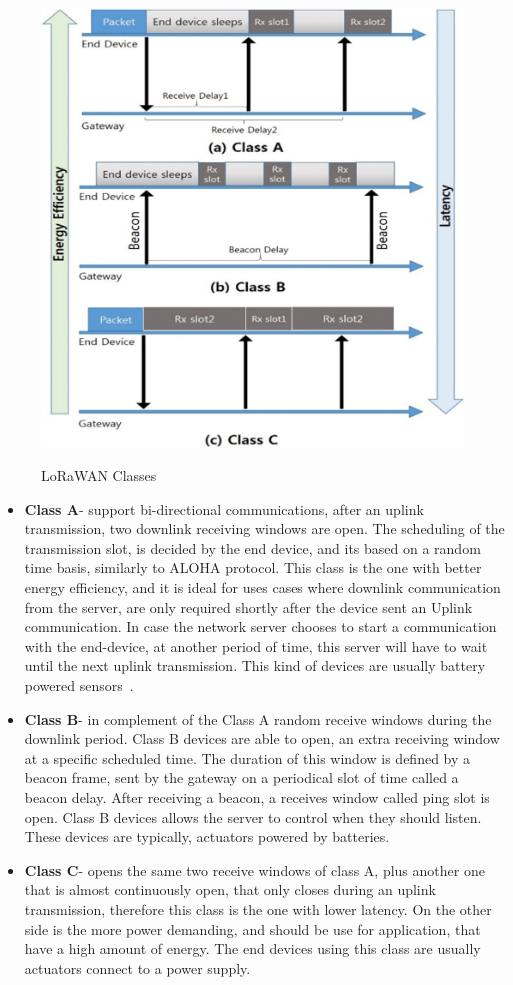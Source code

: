 \begin{figure}[htbp]
  \centering
    {\includegraphics[width=0.5\linewidth]{Chapters/Figures/loraclasses.jpg}}%
  \caption{LoRaWAN Classes~\cite{Sinha2017}}
  \label{fig:lora_classes}
\end{figure}

\begin{itemize}
	\item \textbf{Class A}- support bi-directional communications, after an uplink transmission, two downlink receiving windows are open. The scheduling of the transmission slot, is decided by the end device, and its based on a random time basis, similarly to ALOHA protocol.
	This class is the one with better energy efficiency, and it is ideal for uses cases where downlink communication from the server, are only required shortly after the device sent an Uplink communication.
	In case the network server chooses to start a communication with the end-device, at another period of time, this server will have to wait until the next uplink transmission. This kind of devices are usually battery powered sensors~\cite{Pacheco19}.

	\item\textbf{Class B}- in complement of the Class A random receive windows during the downlink period. Class B devices are able to open, an extra receiving window at a specific scheduled time. The duration of this window is defined by a beacon frame, sent by the gateway on a periodical slot of time called a beacon delay. After receiving a beacon, a receives window called ping slot is open. Class B devices allows the server to control when they should listen. These devices are typically, actuators powered by batteries.
	
	\item \textbf{Class C}- opens the same two receive windows of class A, plus another one that is almost continuously open, that only closes during an uplink transmission, therefore this class is the one with lower latency. On the other side is the more power demanding, and should be use for application, that have a high amount of energy. The end devices using this class are usually actuators connect to a power supply.

\end{itemize}

